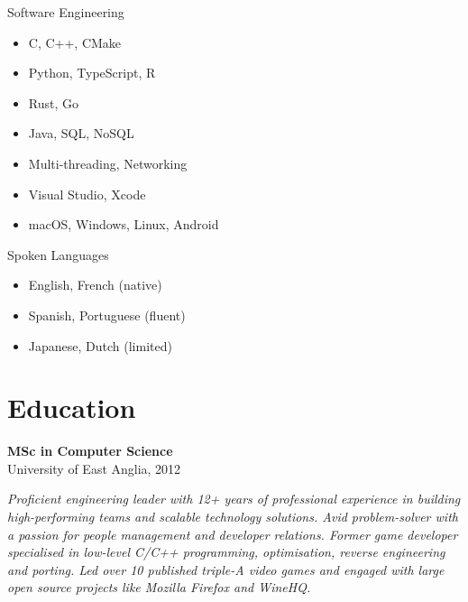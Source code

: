 \documentclass[a4paper,10pt]{article}
\newcommand{\subskill}[1]{{\color{vlightblue} #1}}
\begin{document}
{\begin{minipage}[t]{0.24\textwidth}
{\begin{minipage}[t][\textheight]{\dimexpr\textwidth-10pt}
        \subskill{Software Engineering}
        \begin{itemize}[leftmargin=1em, nosep]
            \item C, C++, CMake
            \item Python, TypeScript, R
            \item Rust, Go
            \item Java, SQL, NoSQL
            \item Multi-threading, Networking
            \item Visual Studio, Xcode
            \item macOS, Windows, Linux, Android
        \end{itemize}
        \vspace{0.5em}

        \subskill{Spoken Languages}
        \begin{itemize}[leftmargin=1em, nosep]
            \item English, French (native)
            \item Spanish, Portuguese (fluent)
            \item Japanese, Dutch (limited)
        \end{itemize}

        \section*{\color{lightblue} Education}
        \textbf{MSc in Computer Science} \\
        University of East Anglia, 2012
        \vfill %
    \end{minipage}%
    }
\end{minipage}%
\hfill%
\begin{minipage}[t]{0.72\textwidth}
    \hspace{-1.55em}
    \colorbox{headerbg}{%
    \begin{minipage}[t]{\dimexpr\textwidth + 0.65em}
        \vspace{0.5cm} %
        \textit{Proficient engineering leader with 12+ years of professional experience in building high-performing teams and scalable technology solutions. Avid problem-solver with a passion for people management and developer relations. Former game developer specialised in low-level C/C++ programming, optimisation, reverse engineering and porting. Led over 10 published triple-A video games and engaged with large open source projects like Mozilla Firefox and WineHQ.}
        \vspace{0.3cm}
    \end{minipage}%
    }

\end{minipage}}
\end{document}
